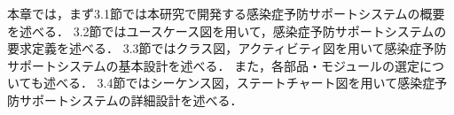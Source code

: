 

本章では，まず3.1節では本研究で開発する感染症予防サポートシステムの概要を述べる．
3.2節ではユースケース図を用いて，感染症予防サポートシステムの要求定義を述べる．
3.3節ではクラス図，アクティビティ図を用いて感染症予防サポートシステムの基本設計を述べる．
また，各部品・モジュールの選定についても述べる．
3.4節ではシーケンス図，ステートチャート図を用いて感染症予防サポートシステムの詳細設計を述べる．